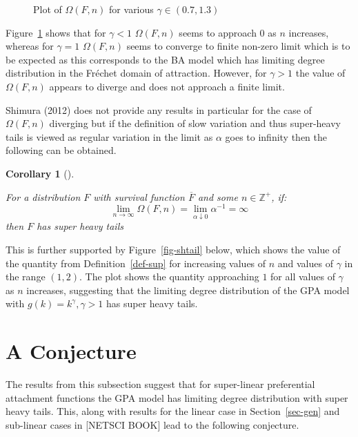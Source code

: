 \documentclass[
  10pt,
  a4paper,
]{scrreprt}
\theoremstyle{plain}
\theoremstyle{plain}
\theoremstyle{definition}
\theoremstyle{plain}
\newtheorem{corollary}{Corollary}[section]
\theoremstyle{remark}
\begin{document}
{\begin{figure}[H]
{}

\caption{\label{fig-omega}Plot of \(\Omega(F,n)\) for various
\(\gamma \in (0.7,1.3)\)}

\end{figure}

Figure~\ref{fig-omega} shows that for \(\gamma<1\) \(\Omega(F,n)\) seems
to approach 0 as \(n\) increases, whereas for \(\gamma=1\)
\(\Omega(F,n)\) seems to converge to finite non-zero limit which is to
be expected as this corresponds to the BA model which has limiting
degree distribution in the Fréchet domain of attraction. However, for
\(\gamma>1\) the value of \(\Omega(F,n)\) appears to diverge and does
not approach a finite limit.

Shimura (2012) does not provide any results in particular for the case
of \(\Omega(F,n)\) diverging but if the definition of slow variation and
thus super-heavy tails is viewed as regular variation in the limit as
\(\alpha\) goes to infinity then the following can be obtained.

\begin{corollary}[]\protect\hypertarget{cor-omg}{}\label{cor-omg}

For a distribution \(F\) with survival function \(\overline F\) and some
\(n\in\mathbb Z^+\), if: \[
\lim_{n\rightarrow\infty} \Omega(F,n) = \lim_{\alpha\downarrow0} \alpha^{-1} = \infty
\] then \(F\) has super heavy tails

\end{corollary}

This is further supported by Figure~\ref{fig-shtail} below, which shows
the value of the quantity from Definition~\ref{def-sup} for increasing
values of \(n\) and values of \(\gamma\) in the range \((1,2)\). The
plot shows the quantity approaching \(1\) for all values of \(\gamma\)
as \(n\) increases, suggesting that the limiting degree distribution of
the GPA model with \(g(k) = k^\gamma,\gamma>1\) has super heavy tails.

\hypertarget{a-conjecture}{%
\section{A Conjecture}\label{a-conjecture}}

The results from this subsection suggest that for super-linear
preferential attachment functions the GPA model has limiting degree
distribution with super heavy tails. This, along with results for the
linear case in Section~\ref{sec-gen} and sub-linear cases in {[}NETSCI
BOOK{]} lead to the following conjecture.

}
\end{document}
